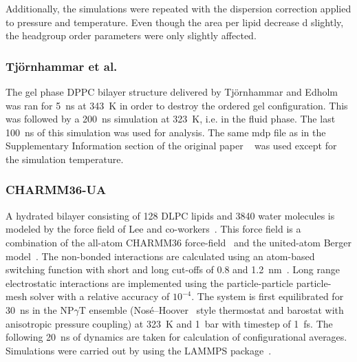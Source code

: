 \documentclass[pre,aps,floatfix,authordate1-4,twocolumn]{revtex4-1}
\begin{document}
Additionally, the simulations were repeated with the dispersion correction applied to pressure and temperature. Even though the area per lipid decrease
d slightly, the headgroup order parameters were only slightly affected.

\subsubsection{Tj\"ornhammar et al.}

The gel phase DPPC bilayer structure delivered by Tj\"ornhammar  and Edholm~\cite{tjornhammar14} was ran for 5~ns at 343~K in order to destroy the 
ordered gel configuration. This was followed by a 200~ns simulation at 323~K, i.e. in the fluid phase. The last 100~ns of this simulation was used for analysis. 
The same mdp file as in the Supplementary Information section of the original paper ~\cite{tjornhammar14} was used except for the simulation temperature.

\subsubsection{CHARMM36-UA}
A hydrated bilayer consisting of 128 DLPC lipids and 3840 water molecules is modeled by the force field of Lee and co-workers~\cite{lee14}.
This force field is a combination of the all-atom CHARMM36 force-field~\cite{klauda10} and the united-atom Berger model~\cite{berger97}. 
The non-bonded interactions are calculated using an atom-based switching function with short and long cut-offs of 0.8 and 1.2~nm~\cite{lee14}. 
Long range electrostatic interactions are implemented using the particle-particle particle-mesh solver with a relative accuracy of $10^{-4}$. The system 
is first equilibrated for 30~ns in the NP$\gamma$T ensemble (Nos\'{e}--Hoover~\cite{nose84,hoover85} style thermostat and barostat with anisotropic pressure coupling) 
at 323~K and 1~bar with timestep of 1~fs. The following 20~ns of dynamics are taken for calculation of configurational averages. 
Simulations were 
carried out by using the LAMMPS package~\cite{plimpton95}. %

\end{document}
